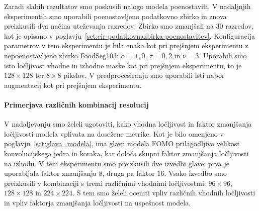 \documentclass[a4paper,twoside,openright,12pt,slovene]{book}
\begin{document}
            Zaradi slabih rezultatov smo poskusili nalogo modela poenostaviti.
            V nadaljnjih eksperimentih smo uporabili poenostavljeno podatkovno
            zbirko in znova preizkusili dva načina uteževanja razredov. Zbirko
            smo zmanjšali na 30 razredov, kot je opisano v
            poglavju~\ref{sct:eir-podatkovnazbirka-poenostavitev}.
            Konfiguracija parametrov v tem eksperimentu je bila enaka kot pri
            prejšnjem eksperimentu z nepoenostavljeno zbirko FoodSeg103:
            \(\alpha=1{,}0\), \(\tau=0{,}2\) in \(\nu=3\). Uporabili smo isto
            ločljivost vhodne in izhodne maske  kot pri prejšnjem eksperimentu,
            to je \(128 \times 128\) ter \(8 \times 8\) pikslov. V
            predprocesiranju smo uporabili isti nabor augmentacij kot pri
            prejšnjem eksperimentu.

            \paragraph{Primerjava različnih kombinacij resolucij}
                
            V nadaljevanju smo želeli ugotoviti, kako vhodna ločljivost in
            faktor zmanjšanja ločljivosti modela vplivata na dosežene metrike.
            Kot je bilo omenjeno v
            poglavju~\ref{sct:glava_modela},
            ima glava modela FOMO prilagodljivo velikost konvolucijskega jedra
            in koraka, kar določa skupni faktor zmanjšanja ločljivosti na
            izhodu. V tem eksperimentu smo preizkusili dve izvedbi glave: prva
            je uporabljala faktor zmanjšanja \(8\), druga pa faktor \(16\).
            Vsako izvedbo smo preizkusili v kombinaciji s tremi različnimi
            vhodnimi ločljivostmi: $96 \times 96$, $128 \times 128$ in $224
            \times 224$. S tem smo želeli oceniti vpliv različnih vhodnih
            ločljivosti in vpliv faktorja zmanjšanja ločljivosti na uspešnost
            modela.
\end{document}
